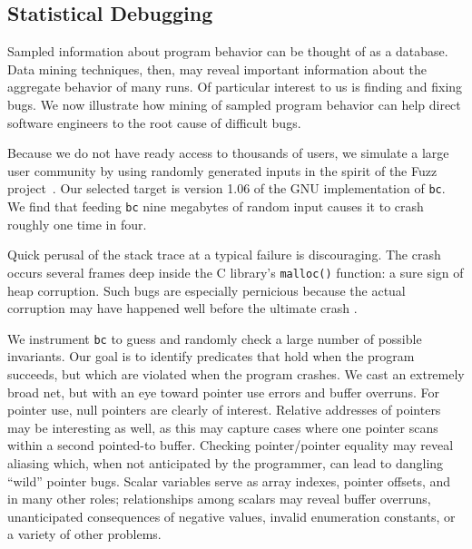 \subsection{Statistical Debugging}
\label{sec:debug}

Sampled information about program behavior can be thought of as a
database.  Data mining techniques, then, may reveal important
information about the aggregate behavior of many runs.  Of particular
interest to us is finding and fixing bugs.  We now illustrate how
mining of sampled program behavior can help direct software engineers
to the root cause of difficult bugs.

Because we do not have ready access to thousands of users, we simulate
a large user community by using randomly generated inputs in the
spirit of the Fuzz project~\cite{MKLMMNS95}.  Our selected target is
version 1.06 of the GNU implementation of \texttt{bc}.  We find that
feeding \texttt{bc} nine megabytes of random input causes it to crash
roughly one time in four.  

Quick perusal of the stack trace at a typical failure is discouraging.
The crash occurs several frames deep inside the C library's
\texttt{malloc()} function: a sure sign of heap corruption.  Such bugs
are especially pernicious because the actual corruption may have
happened well before the ultimate crash \cite{Eisenstadt1993b}.

We instrument \texttt{bc} to guess and randomly check a large number
of possible invariants.  Our goal is to identify predicates that hold
when the program succeeds, but which are violated when the program
crashes.  We cast an extremely broad net, but with an eye toward
pointer use errors and buffer overruns.  For pointer use, null
pointers are clearly of interest.  Relative addresses of pointers may
be interesting as well, as this may capture cases where one pointer
scans within a second pointed-to buffer.  Checking pointer/pointer
equality may reveal aliasing which, when not anticipated by the
programmer, can lead to dangling ``wild'' pointer bugs.  Scalar
variables serve as array indexes, pointer offsets, and in many other
roles; relationships among scalars may reveal buffer overruns,
unanticipated consequences of negative values, invalid enumeration
constants, or a variety of other problems.

